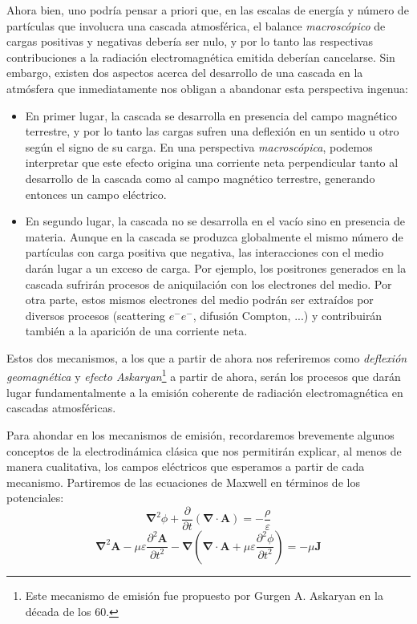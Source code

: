\documentclass[12 pt, a4paper]{article} %
\numberwithin{equation}{section}
\numberwithin{figure}{section}
\newcommand{\vect}[1]{\boldsymbol{\mathbf{#1}}}
\begin{document}
	Ahora bien, uno podría pensar a priori que, en las escalas de energía y número de partículas que involucra una cascada atmosférica, el balance \textit{macroscópico} de cargas positivas y negativas debería ser nulo, y por lo tanto las respectivas contribuciones a la radiación electromagnética emitida deberían cancelarse. Sin embargo, existen dos aspectos acerca del desarrollo de una cascada en la atmósfera que inmediatamente nos obligan a abandonar esta perspectiva ingenua:
	\begin{itemize}
		\item En primer lugar, la cascada se desarrolla en presencia del campo magnético terrestre, y por lo tanto las cargas sufren una deflexión en un sentido u otro según el signo de su carga. En una perspectiva \textit{macroscópica}, podemos interpretar que este efecto origina una corriente neta perpendicular tanto al desarrollo de la cascada como al campo magnético terrestre, generando entonces un campo eléctrico.
		\item En segundo lugar, la cascada no se desarrolla en el vacío sino en presencia de materia. Aunque en la cascada se produzca globalmente el mismo número de partículas con carga positiva que negativa, las interacciones con el medio darán lugar a un exceso de carga. Por ejemplo, los positrones generados en la cascada sufrirán procesos de aniquilación con los electrones del medio. Por otra parte, estos mismos electrones del medio podrán ser extraídos por diversos procesos (scattering $e^-e^-$, difusión Compton, ...) y contribuirán también a la aparición de una corriente neta. 
	\end{itemize}

Estos dos mecanismos, a los que a partir de ahora nos referiremos como \textit{deflexión geomagnética} y \textit{efecto Askaryan}\footnote{ Este mecanismo de emisión fue propuesto por Gurgen A. Askaryan en la década de los 60.} a partir de ahora, serán los procesos que darán lugar fundamentalmente a la emisión coherente de radiación electromagnética en cascadas atmosféricas.

Para ahondar en los mecanismos de emisión, recordaremos brevemente algunos conceptos de la electrodinámica clásica que nos permitirán explicar, al menos de manera cualitativa, los campos eléctricos que esperamos a partir de cada mecanismo. Partiremos de las ecuaciones de Maxwell en términos de los potenciales:
	\begin{equation}
	\vect{\nabla}^2\phi+\frac{\partial}{\partial t}\left(\vect{\nabla}\cdot\vect{A}\right)=-\frac{\rho}{\varepsilon}\label{ec31}
	\end{equation}
	\begin{equation}
	\vect{\nabla}^2\vect{A}-\mu\varepsilon\frac{\partial^2\vect{A}}{\partial t^2}-\vect{\nabla}\left(\vect{\nabla}\cdot\vect{A}+\mu\varepsilon\frac{\partial^2\phi}{\partial t^2}\right)=-\mu\vect{J}\label{ec32}
	\end{equation}
\end{document}
